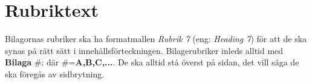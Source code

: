 \chapter{Rubriktext}
Bilagornas rubriker ska ha formatmallen \textit{Rubrik 7} (eng:
\textit{Heading 7}) för att de ska synas på rätt sätt i innehållsförteckningen.
Bilagerubriker inleds alltid med \textbf{Bilaga} \#: där \#=\textbf{A,B,C,...}.
De ska alltid stå överst på sidan, det vill säga de ska föregås av sidbrytning.
